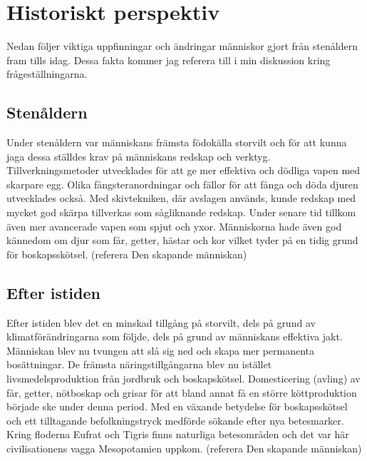 \section{Historiskt perspektiv}
Nedan följer viktiga uppfinningar och ändringar människor gjort från stenåldern fram tills idag. Dessa fakta kommer jag referera till i min diskussion kring frågeställningarna. 
 
\subsection{Stenåldern}
Under stenåldern var människans främsta födokälla storvilt och för att kunna jaga dessa ställdes krav på människans redskap och verktyg. Tillverkningsmetoder utvecklades för att ge mer effektiva och dödliga vapen med skarpare egg. Olika fångsteranordningar och fällor för att fånga och döda djuren utvecklades också. Med skivtekniken, där avslagen används, kunde redskap med mycket god skärpa tillverkas som sågliknande redskap. Under senare tid tillkom även mer avancerade vapen som spjut och yxor.  
\newline
\newline
Människorna hade även god kännedom om djur som får, getter, hästar och kor vilket tyder på en tidig grund för boskapsskötsel. 
\newline
(referera Den skapande människan)
     
\subsection{Efter istiden}
Efter istiden blev det en minskad tillgång på storvilt, dels på grund av klimatförändringarna som följde, dels på grund av människans effektiva jakt. Människan blev nu tvungen att slå sig ned och skapa mer permanenta bosättningar. De främsta näringstillgångarna blev nu istället livsmedelsproduktion från jordbruk och boskapskötsel. Domesticering (avling) av får, getter, nötboskap och grisar för att bland annat få en större köttproduktion började ske under denna period. 
\newline
\newline
Med en växande betydelse för boskapsskötsel och ett tilltagande befolkningstryck medförde sökande efter nya betesmarker. Kring floderna Eufrat och Tigris finns naturliga betesområden och det var här civilisationens vagga Mesopotamien uppkom.   
\newline
\newline
(referera Den skapande människan)

